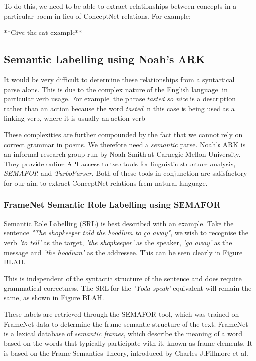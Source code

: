 To do this, we need to be able to extract relationships between concepts in a particular poem in lieu of ConceptNet relations. For example:

**Give the cat example**

\subsection{Semantic Labelling using Noah's ARK}

It would be very difficult to determine these relationships from a syntactical parse alone. This is due to the complex nature of the English language, in particular verb usage. For example, the phrase \textit{tasted so nice} is a description rather than an action because the word \textit{tasted} in this case is being used as a linking verb, where it is usually an action verb.

These complexities are further compounded by the fact that we cannot rely on correct grammar in poems. We therefore need a \textit{semantic} parse. Noah's ARK is an informal research group run by Noah Smith at Carnegie Mellon University. They provide online API access to two tools for linguistic structure analysis, \textit{SEMAFOR} and \textit{TurboParser}. Both of these tools in conjunction are satisfactory for our aim to extract ConceptNet relations from natural language.

\subsubsection{FrameNet Semantic Role Labelling using SEMAFOR}
\label{sec:sema}

Semantic Role Labelling (SRL) is best described with an example. Take the sentence \textit{"The shopkeeper told the hoodlum to go away"}, we wish to recognise the verb \textit{'to tell'} as the target, \textit{'the shopkeeper'} as the speaker, \textit{'go away'} as the message and \textit{'the hoodlum'} as the addressee. This can be seen clearly in Figure BLAH. 

This is independent of the syntactic structure of the sentence and does require grammatical correctness. The SRL for the \textit{'Yoda-speak'} equivalent will remain the same, as shown in Figure BLAH.

These labels are retrieved through the SEMAFOR tool, which was trained on FrameNet data to determine the frame-semantic structure of the text. FrameNet is a lexical database of \textit{semantic frames}, which describe the meaning of a word based on the words that typically participate with it, known as frame elements. It is based on the Frame Semantics Theory, introduced by Charles J.Fillmore et al.

